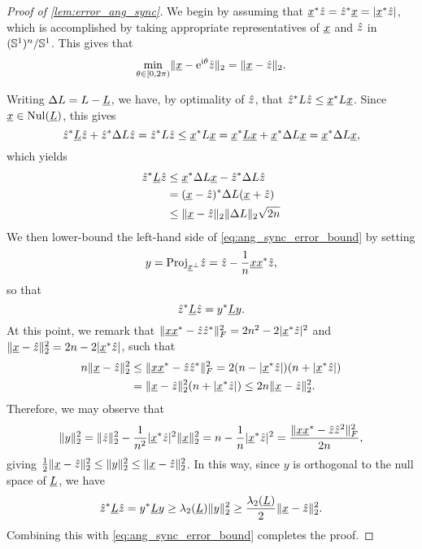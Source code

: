 \begin{proof}[Proof of \cref{lem:error_ang_sync}]
  We begin by assuming that $\underline{x}^* \hat{z} = \hat{z}^* \underline{x} = |\underline{x}^* \hat{z}|$, which is accomplished by taking appropriate representatives of $\underline{x}$ and $\hat{z}$ in $(\mathbb{S}^1)^n / \mathbb{S}^1$.  This gives that \[\min_{\theta \in [0, 2 \pi)} \lVert \underline{x} - \mathrm{e}^{\mathrm{i} \theta} \hat{z}\rVert_2 = \lVert \underline{x} - \hat{z}\rVert_2.\]

  Writing $\Delta L = L - \underline{L}$, we have, by optimality of $\hat{z}$, that $\hat{z}^* L \hat{z} \le \underline{x}^* L \underline{x}$.  Since $\underline{x} \in \operatorname{Nul}(\underline{L})$, this gives \[\hat{z}^* \underline{L} \hat{z} + \hat{z}^* \Delta L \hat{z} = \hat{z}^* L \hat{z} \le \underline{x}^* L \underline{x} = \underline{x}^* \underline{L} \underline{x} + \underline{x}^* \Delta L \underline{x} = \underline{x}^* \Delta L \underline{x},\] which yields \begin{equation} \begin{aligned} \hat{z}^* \underline{L} \hat{z} &\le \underline{x}^* \Delta L \underline{x} - \hat{z}^* \Delta L \hat{z} \\ &= (\underline{x} - \hat{z})^* \Delta L (\underline{x} + \hat{z}) \\ &\le \lVert \underline{x} - \hat{z}\rVert_2 \lVert \Delta L\rVert_2 \sqrt{2 n} \end{aligned} \label{eq:ang_sync_error_bound}\end{equation}  We then lower-bound the left-hand side of \eqref{eq:ang_sync_error_bound} by setting \[y = \mathrm{Proj}_{\underline{x}^\perp} \hat{z} = \hat{z} - \frac{1}{n} \underline{x} \underline{x}^* \hat{z},\] so that \[\hat{z}^* \underline{L} \hat{z} = y^* \underline{L} y.\]  At this point, we remark that $\lVert \underline{x} \underline{x}^* - \hat{z} \hat{z}^* \rVert_F^2 = 2n^2 - 2 |\underline{x}^* \hat{z}|^2$ and $\lVert \underline{x} - \hat{z}\rVert_2^2 = 2 n - 2|\underline{x}^* \hat{z}|$, such that \begin{align*} n \lVert \underline{x} - \hat{z}\rVert_2^2 &\le \lVert \underline{x} \underline{x}^* - \hat{z} \hat{z}^* \rVert_F^2 = 2 (n - |\underline{x}^* \hat{z}|) (n + |\underline{x}^* \hat{z}|) \\ &= \lVert \underline{x} - \hat{z}\rVert_2^2(n + |\underline{x}^* \hat{z}|) \le 2 n \lVert \underline{x} - \hat{z}\rVert_2^2. \end{align*}  Therefore, we may observe that \[\lVert y \rVert_2^2 = \lVert \hat{z} \rVert_2^2 - \frac{1}{n^2} |\underline{x}^* \hat{z}|^2 \lVert \underline{x} \rVert_2^2 = n - \frac{1}{n} |\underline{x}^* \hat{z}|^2 = \dfrac{\lVert \underline{x} \underline{x}^* - \hat{z} \hat{z}^2\rVert_F^2}{2 n},\] giving $\frac{1}{2} \lVert \underline{x} - \hat{z}\rVert_2^2 \le \lVert y \rVert_2^2 \le \lVert \underline{x} - \hat{z} \rVert_2^2$.  In this way, since $y$ is orthogonal to the null space of $\underline{L}$, we have \begin{equation} \hat{z}^* \underline{L} \hat{z} = y^* \underline{L} y \ge \lambda_2(\underline{L}) \lVert y \rVert_2^2 \ge \frac{\lambda_2(\underline{L})}{2} \lVert \underline{x} - \hat{z} \rVert_2^2. \label{eq:dist_quad}\end{equation}  Combining this with \eqref{eq:ang_sync_error_bound} completes the proof.
\end{proof}

